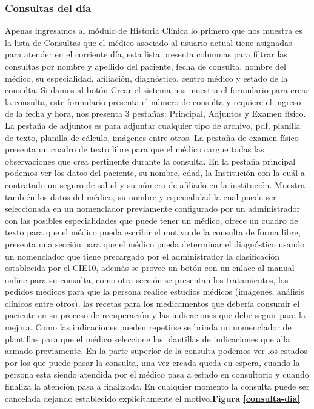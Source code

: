 {\correccionTexto
\subsubsection{Consultas del día}
Apenas ingresamos al módulo de Historia Clínica lo primero que nos muestra es la lista de Consultas que el médico asociado al usuario actual tiene asignadas para atender en el corriente día, esta lista presenta columnas para filtrar las consultas por nombre y apellido del paciente, fecha de consulta, nombre del médico, su especialidad, afiliación, diagnóstico, centro médico y estado de la consulta.
Si damos al botón Crear el sistema nos muestra el formulario para crear la consulta, este formulario presenta el número de consulta y requiere el ingreso de la fecha y hora, nos presenta 3 pestañas: Principal, Adjuntos y Examen físico. 
La pestaña de adjuntos es para adjuntar cualquier tipo de archivo, pdf, planilla de texto, planilla de cálculo, imágenes entre otros.
La pestaña de examen físico presenta un cuadro de texto libre para que el médico cargue todas las observaciones que crea pertinente durante la consulta.
En la pestaña principal podemos ver los datos del paciente, su nombre, edad, la Institución con la cuál a contratado un seguro de salud y su número de afiliado en la institución. Muestra también los datos del médico, su nombre y especialidad la cual puede ser seleccionada en un nomenclador previamente configurado por un administrador con las posibles especialidades que puede tener un médico, ofrece un cuadro de texto para que el médico pueda escribir el motivo de la consulta de forma libre, presenta una sección para que el médico pueda determinar el diagnóstico usando un nomenclador que tiene precargado por el administrador la clasificación establecida por el CIE10, además se provee un botón con un enlace al manual online para su consulta, como otra sección se presentan los tratamientos, los pedidos médicos para que la persona realice estudios médicos (imágenes, análisis clínicos entre otros), las recetas para los medicamentos que debería consumir el paciente en su proceso de recuperación y las indicaciones que debe seguir para la mejora. Como las indicaciones pueden repetirse se brinda un nomenclador de plantillas para que el médico seleccione las plantillas de indicaciones que alla armado previamente. En la parte superior de la consulta podemos ver los estados por los que puede pasar la consulta, una vez creada queda en espera, cuando la persona esta siendo atendida por el médico pasa a estado en consultorio y cuando finaliza la atención pasa a finalizada. En cualquier momento la consulta puede ser cancelada dejando establecido explícitamente el motivo.\textbf{Figura \ref{consulta-dia}}}

